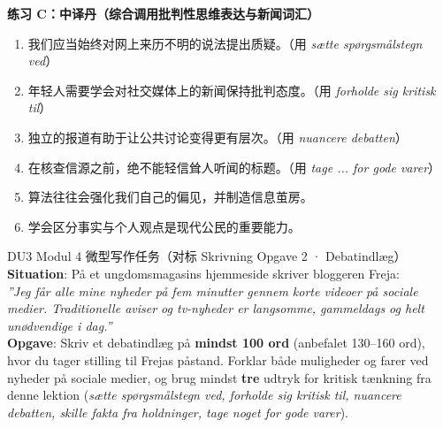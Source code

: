 \textbf{练习 C：中译丹（综合调用批判性思维表达与新闻词汇）}
\begin{enumerate}
  \item 我们应当始终对网上来历不明的说法提出质疑。（用 \textit{sætte spørgsmålstegn ved}）
  \item 年轻人需要学会对社交媒体上的新闻保持批判态度。（用 \textit{forholde sig kritisk til}）
  \item 独立的报道有助于让公共讨论变得更有层次。（用 \textit{nuancere debatten}）
  \item 在核查信源之前，绝不能轻信耸人听闻的标题。（用 \textit{tage ... for gode varer}）
  \item 算法往往会强化我们自己的偏见，并制造信息茧房。
  \item 学会区分事实与个人观点是现代公民的重要能力。
\end{enumerate}


\begin{emailbox}{DU3 Modul 4 微型写作任务（对标 Skrivning Opgave 2 · Debatindlæg）}
\textbf{Situation}: På et ungdomsmagasins hjemmeside skriver bloggeren Freja:\\
\textit{”Jeg får alle mine nyheder på fem minutter gennem korte videoer på sociale medier. Traditionelle aviser og tv-nyheder er langsomme, gammeldags og helt unødvendige i dag.”}\\[4pt]
\textbf{Opgave}: Skriv et debatindlæg på \textbf{mindst 100 ord} (anbefalet 130--160 ord), hvor du tager stilling til Frejas påstand. Forklar både muligheder og farer ved nyheder på sociale medier, og brug mindst \textbf{tre} udtryk for kritisk tænkning fra denne lektion (\textit{sætte spørgsmålstegn ved, forholde sig kritisk til, nuancere debatten, skille fakta fra holdninger, tage noget for gode varer}).
\end{emailbox}

